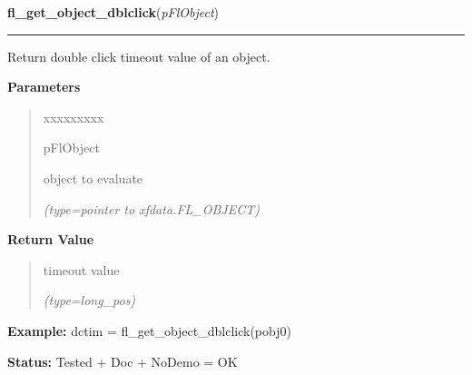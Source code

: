\hspace{.8\funcindent}\begin{boxedminipage}{\funcwidth}

    \raggedright \textbf{fl\_get\_object\_dblclick}(\textit{pFlObject})

    \vspace{-1.5ex}

    \rule{\textwidth}{0.5\fboxrule}
\setlength{\parskip}{2ex}
    Return double click timeout value of an object.

\setlength{\parskip}{1ex}
      \textbf{Parameters}
      \vspace{-1ex}

      \begin{quote}
        \begin{Ventry}{xxxxxxxxx}

          \item[pFlObject]

          object to evaluate

            {\it (type=pointer to xfdata.FL\_OBJECT)}

        \end{Ventry}

      \end{quote}

      \textbf{Return Value}
    \vspace{-1ex}

      \begin{quote}
      timeout value

      {\it (type=long\_pos)}

      \end{quote}

\textbf{Example:} dctim = fl\_get\_object\_dblclick(pobj0)



\textbf{Status:} Tested + Doc + NoDemo = OK



    \end{boxedminipage}

    \label{xformslib:flbasic:fl_set_object_geometry}

    \vspace{0.5ex}

